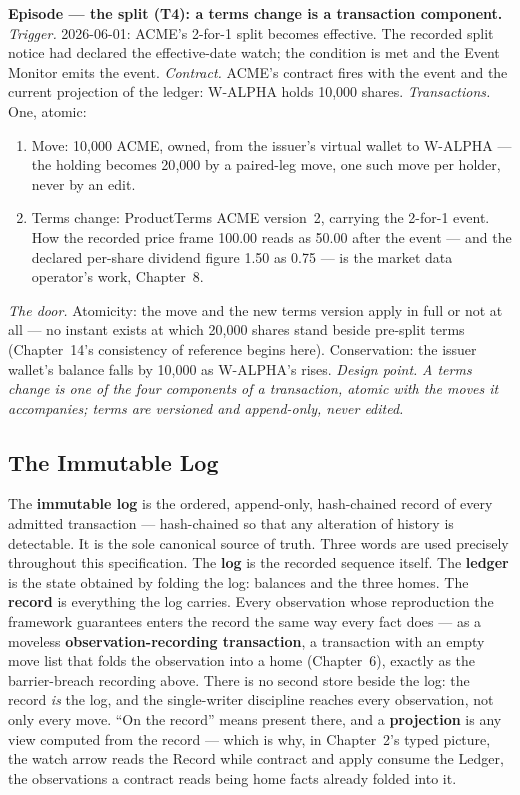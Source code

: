 \documentclass[11pt,a4paper]{article}
\begin{document}
\medskip\noindent\textbf{Episode --- the split (T4): a terms change is a transaction
component.}
\emph{Trigger.} 2026-06-01: ACME's 2-for-1 split becomes effective. The recorded split
notice had declared the effective-date watch; the condition is met and the Event Monitor
emits the event.
\emph{Contract.} ACME's contract fires with the event and the current projection of the
ledger: W-ALPHA holds 10{,}000 shares.
\emph{Transactions.} One, atomic:
\begin{enumerate}[nosep,leftmargin=2.2em]
\item Move: 10{,}000 ACME, owned, from the issuer's virtual wallet to W-ALPHA --- the
  holding becomes 20{,}000 by a paired-leg move, one such move per holder, never by an
  edit.
\item Terms change: ProductTerms ACME version~2, carrying the 2-for-1 event. How the
  recorded price frame 100.00 reads as 50.00 after the event --- and the declared
  per-share dividend figure 1.50 as 0.75 --- is the market data operator's work,
  Chapter~8.
\end{enumerate}
\emph{The door.} Atomicity: the move and the new terms version apply in full or not at
all --- no instant exists at which 20{,}000 shares stand beside pre-split terms
(Chapter~14's consistency of reference begins here). Conservation: the issuer wallet's
balance falls by 10{,}000 as W-ALPHA's rises.
\emph{Design point.} \emph{A terms change is one of the four components of a
transaction, atomic with the moves it accompanies; terms are versioned and append-only,
never edited.}

\subsection{The Immutable Log}

The \textbf{immutable log} is the ordered, append-only, hash-chained record of every
admitted transaction --- hash-chained so that any alteration of history is detectable.
It is the sole canonical source of truth. Three words are used precisely throughout this
specification. The \textbf{log} is the recorded sequence itself. The \textbf{ledger} is
the state obtained by folding the log: balances and the three homes. The \textbf{record}
is everything the log carries. Every observation whose reproduction the framework
guarantees enters the record the same way every fact does --- as a moveless
\textbf{observation-recording transaction}, a transaction with an empty move list that
folds the observation into a home (Chapter~6), exactly as the barrier-breach recording
above. There is no second store beside the log: the record \emph{is} the log, and the
single-writer discipline reaches every observation, not only every move. ``On the
record'' means present there, and a \textbf{projection} is any view computed from the
record --- which is why, in Chapter~2's typed picture, the watch arrow reads the Record
while contract and apply consume the Ledger, the observations a contract reads being home
facts already folded into it.
\end{document}
